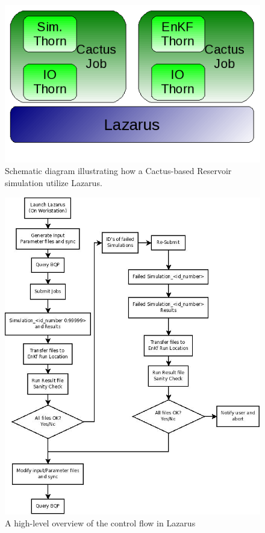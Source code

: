 \documentclass[conference,final]{IEEEtran}
\begin{document}
\begin{figure}
\begin{center}
\includegraphics[scale=0.5]{./figures/Simulations.png}
\caption{Schematic diagram illustrating how a Cactus-based Reservoir
  simulation utilize Lazarus.}
\end{center}
\label{fig:application_usage}
\end{figure}


\begin{figure}
\begin{center}
\includegraphics[scale=0.35]{./figures/Diagram1.jpeg}
\end{center}
\caption{A high-level
  overview of the control flow in Lazarus}
\label{fig:controlflow}
\end{figure}
\end{document}
